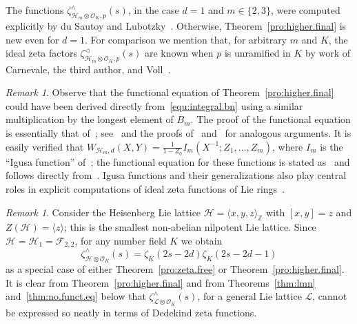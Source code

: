 \documentclass[11pt,a4paper]{amsart}
\theoremstyle{plain}
\theoremstyle{remark}
\newtheorem{rem}[thm]{Remark}
\newcommand{\Z}{\mathbb{Z}}
\newcommand{\tensor}{\otimes}
\begin{document}
The functions $\zeta^\wedge_{\mathcal{H}_m \tensor \mathcal{O}_K,p}(s)$, in the case $d = 1$ and $m \in \{2,3 \}$, were computed explicitly by du Sautoy and Lubotzky~\cite[\S3.3 and Example~1.4(2)]{duSLubotzky/96}.  Otherwise, Theorem~\ref{pro:higher.final} is new even for $d = 1$.  For comparison we mention that, for arbitrary $m$ and $K$, the ideal zeta factors $\zeta^\vartriangleleft_{\mathcal{H}_m \tensor \mathcal{O}_K,p}(s)$ are known when $p$ is unramified in $K$ by work of Carnevale, the third author, and Voll~\cite[Section~5.4]{CSV/19}.

\begin{rem} \label{rmk:higher.heisenberg}
Observe that the functional equation of Theorem~\ref{pro:higher.final} could have been derived directly from~\eqref{equ:integral.bn} using a similar multiplication by the longest element of $B_m$.  The proof of the functional equation is essentially that of~\cite[Theorem~4]{Voll/05}; see~\cite[p.~707]{Igusa/89} and the proofs of~\cite[Theorem~5.9]{duSLubotzky/96} and~\cite[Corollary~2.7]{Berman/11} for analogous arguments.  It is easily verified that $W_{\mathcal{H}_m,d}(X,Y) = \frac{1}{1 - Z_0} I_m(X^{-1}; Z_1, \dots, Z_m)$,
where $I_m$ is the ``Igusa function'' of~\cite[Definition~2.5]{SV1/15}; the functional equation for these functions is stated as~\cite[Proposition~4.2]{SV1/15} and follows directly from~\cite[Theorem~4]{Voll/05}.  Igusa functions and their generalizations also play central roles in explicit computations of ideal zeta functions of Lie rings~\cite{CSV/19, SV2/16}.
\end{rem}

\begin{rem} \label{rem:heisenberg}
Consider the Heisenberg Lie lattice $\mathcal{H} = \langle x, y, z \rangle_\Z$ with $[x,y] = z$ and $Z(\mathcal{H}) = \langle z \rangle$; this is the smallest non-abelian nilpotent Lie lattice.  Since $\mathcal{H} = \mathcal{H}_1 = \mathcal{F}_{2,2}$, for any number field $K$ we obtain 
$$\zeta^\wedge_{\mathcal{H} \tensor \mathcal{O}_K}(s) = \zeta_K (2s - 2d) \zeta_K (2s - 2d - 1)$$
as a special case of either Theorem~\ref{pro:zeta.free} or Theorem~\ref{pro:higher.final}.  It is clear from Theorem~\ref{pro:higher.final} and from Theorems~\ref{thm:lmn} and~\ref{thm:no.funct.eq} below that $\zeta^\wedge_{\mathcal{L} \tensor \mathcal{O}_K}(s)$, for a general Lie lattice $\mathcal{L}$, cannot be expressed so neatly in terms of Dedekind zeta functions.
\end{rem}
\end{document}
